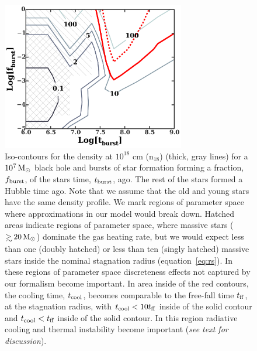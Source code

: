 \documentclass[usenatbib,fleqn]{mnras}
\newcommand\gsim{\mathrel{\rlap{\lower4pt\hbox{\hskip1pt$\sim$}}
    \raise1pt\hbox{$>$}}}
\newcommand{\Mbh}[1][]{M_{\bullet#1}}
\newcommand{\Msun}{{\rm M_\odot}}
\begin{document}



 

\begin{figure} 
  \includegraphics[width=8cm]{cnm_plot.pdf}
  \caption{\label{fig:param} Iso-contours for the density at $10^{18}$
    cm ($\mathrm{n_{18}}$) (thick, gray lines) for a $10^{7} \, \Msun$
    black hole and bursts of star formation forming a fraction,
    $f_{\rm burst}$, of the stars time, $t_{\rm burst}$, ago. The rest
    of the stars formed a Hubble time ago. Note that we assume that
    the old and young stars have the same density profile. We mark
    regions of parameter space where approximations in our model would
    break down. Hatched areas indicate regions of parameter space,
    where massive stars ($\gsim 20 \, \Msun$) dominate the gas heating
    rate, but we would expect less than one (doubly hatched) or less
    than ten (singly hatched) massive stars inside the nominal
    stagnation radius (equation~\eqref{eq:rs}). In these regions of
    parameter space discreteness effects not captured by our formalism
    become important. In area inside of the red contours, the cooling
    time, $t_{\rm cool}$, becomes comparable to the free-fall time
    $t_{\rm ff}$, at the stagnation radius, with $t_{\rm cool}<10
    t_{\rm ff}$ inside of the solid contour and $t_{\rm cool}< t_{\rm
      ff}$ inside of the solid contour. In this region radiative
    cooling and thermal instability become important (\textit{see text
      for discussion}).}
\end{figure}
\end{document}
